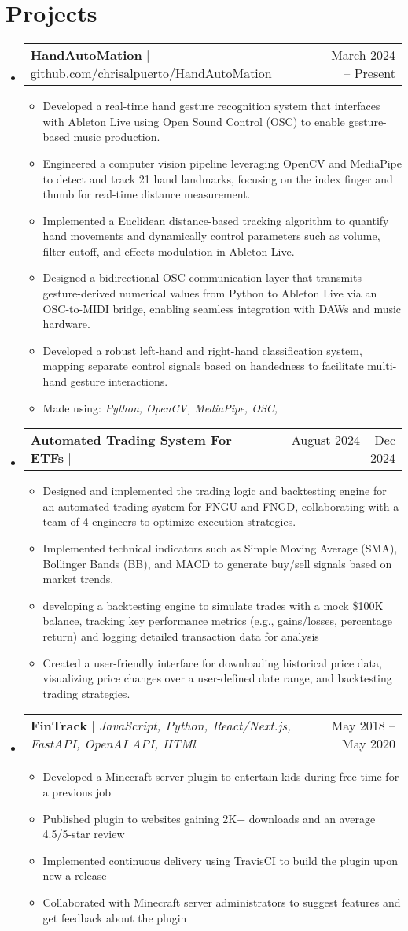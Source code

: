 \documentclass[letterpaper,11pt]{article}
\makeatletter
\newcommand{\resumeItem}[1]{
  \item\small{
    {#1 \vspace{-2pt}}
  }
}
\newcommand{\resumeProjectHeading}[2]{
    \item
    \begin{tabular*}{0.97\textwidth}{l@{\extracolsep{\fill}}r}
      \small#1 & #2 \\
    \end{tabular*}\vspace{-7pt}
}
\newcommand{\resumeSubHeadingListStart}{\begin{itemize}[leftmargin=0.15in, label={}]}
\newcommand{\resumeSubHeadingListEnd}{\end{itemize}}
\newcommand{\resumeItemListStart}{\begin{itemize}}
\newcommand{\resumeItemListEnd}{\end{itemize}\vspace{-5pt}}
\makeatother
\begin{document}
\section{Projects}
    \resumeSubHeadingListStart
      \resumeProjectHeading
          {\textbf{HandAutoMation} $|$ \underline{github.com/chrisalpuerto/HandAutoMation}}{March 2024 -- Present}
          \resumeItemListStart
            \resumeItem{Developed a real-time hand gesture recognition system that interfaces with Ableton Live using Open Sound Control (OSC) to enable gesture-based music production.}
            \resumeItem{Engineered a computer vision pipeline leveraging OpenCV and MediaPipe to detect and track 21 hand landmarks, focusing on the index finger and thumb for real-time distance measurement.}
            \resumeItem{Implemented a Euclidean distance-based tracking algorithm to quantify hand movements and dynamically control parameters such as volume, filter cutoff, and effects modulation in Ableton Live.}
            \resumeItem{Designed a bidirectional OSC communication layer that transmits gesture-derived numerical values from Python to Ableton Live via an OSC-to-MIDI bridge, enabling seamless integration with DAWs and music hardware.}
            \resumeItem{Developed a robust left-hand and right-hand classification system, mapping separate control signals based on handedness to facilitate multi-hand gesture interactions.}
            \resumeItem{{Made using: }\emph{Python, OpenCV, MediaPipe, OSC, }}
          \resumeItemListEnd
      \resumeProjectHeading
          {\textbf{Automated Trading System For ETFs} $|$ }{August 2024 -- Dec 2024}
          \resumeItemListStart
            \resumeItem{Designed and implemented the trading logic and backtesting engine for an automated trading system for FNGU and FNGD, collaborating with a team of 4 engineers to optimize execution strategies.}
            \resumeItem{Implemented technical indicators such as Simple Moving Average (SMA), Bollinger Bands (BB), and MACD to generate buy/sell signals based on market trends.}
            \resumeItem{developing a backtesting engine to simulate trades with a mock \$100K balance, tracking key performance metrics (e.g., gains/losses, percentage return) and logging detailed transaction data for analysis}
            \resumeItem{Created a user-friendly interface for downloading historical price data, visualizing price changes over a user-defined date range, and backtesting trading strategies.}
          \resumeItemListEnd
          \resumeProjectHeading
          {\textbf{FinTrack} $|$ \emph{JavaScript, Python, React/Next.js, FastAPI, OpenAI API, HTMl}}{May 2018 -- May 2020}
          \resumeItemListStart
            \resumeItem{Developed a Minecraft server plugin to entertain kids during free time for a previous job}
            \resumeItem{Published plugin to websites gaining 2K+ downloads and an average 4.5/5-star review}
            \resumeItem{Implemented continuous delivery using TravisCI to build the plugin upon new a release}
            \resumeItem{Collaborated with Minecraft server administrators to suggest features and get feedback about the plugin}
          \resumeItemListEnd
    \resumeSubHeadingListEnd
\end{document}
